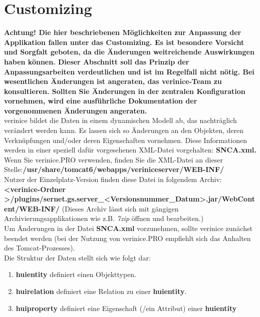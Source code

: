 \documentclass[a4paper,10pt]{book}
\begin{document}
\chapter{Customizing}
\textbf{Achtung! Die hier beschriebenen Möglichkeiten zur Anpassung der Applikation fallen unter das Customizing.
Es ist besondere Vorsicht und Sorgfalt geboten, da die Änderungen weitreichende Auswirkungen haben können. Dieser Abschnitt soll
das Prinzip der Anpassungsarbeiten verdeutlichen und ist im Regelfall nicht nötig. Bei wesentlichen Änderungen ist angeraten, das
verinice-Team zu konsultieren. Sollten Sie Änderungen in der zentralen Konfiguration vornehmen, wird eine ausführliche Dokumentation
der vorgenommenen Änderungen angeraten.}
\newline\\
verinice bildet die Daten in einem dynamischen Modell ab, das nachträglich verändert werden kann. Es lassen sich so Änderungen an den
Objekten, deren Verknüpfungen und/oder deren Eigenschaften vornehmen. Diese Informationen werden in einer speziell dafür vorgesehenen
XML-Datei vorgehalten: \textbf{SNCA.xml.}
\newline\\
Wenn Sie verinice.\textsc{PRO} verwenden, finden Sie die XML-Datei an dieser Stelle:\newline \textbf{/usr/share/tomcat6/webapps/veriniceserver/WEB-INF/}
\newline\\
Nutzer der Einzelplatz-Version finden diese Datei in folgendem Archiv: \textbf{\textless verinice-Ordner \textgreater/plugins/sernet.gs.server\_\textless Versionsnummer\_Datum\textgreater.jar/\allowbreak WebContent/WEB-INF/}
(Dieses Archiv lässt sich mit gängigen Archivierungsapplikationen wie z.B. \textit{7zip} öffnen und bearbeiten.)
\newline\\
Um Änderungen in der Datei \textbf{SNCA.xml} vorzunehmen, sollte verinice zunächst beendet werden (bei der Nutzung von verinice.\textsc{PRO} empfiehlt sich das
Anhalten des Tomcat-Prozesses).
\newline\\
Die Struktur der Daten stellt sich wie folgt dar:
\begin{enumerate}
\item \textbf{huientity} definiert einen Objekttypen.
\item \textbf{huirelation} definiert eine Relation zu einer \textbf{huientity}.
\item \textbf{huiproperty} definiert eine Eigenschaft (/ein Attribut) einer \textbf{huientity}
\end{enumerate}
\end{document}
